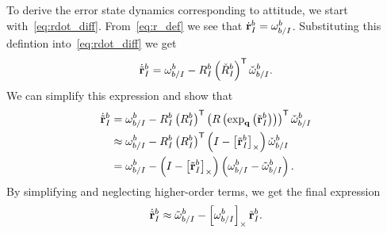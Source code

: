 To derive the error state dynamics corresponding to attitude, we start
with~\eqref{eq:rdot_diff}. From~\eqref{eq:r_def} we see that $\dot{\mathrm{\mathbf{r}}}_I^b
= \mathrm{\mathbf{\omega}}_{b/I}^b$. Substituting this defintion into~\eqref{eq:rdot_diff}
we get
\begin{equation}
\dot{\tilde{\mathrm{\mathbf{r}}}}_I^b = \mathrm{\mathbf{\omega}}_{b/I}^{b} -
R_I^b\left(\check{R}_I^b\right)^{\mathsf{T}} \check{\mathrm{\mathbf{\omega}}}_{b/I}^{b}.
\end{equation}
We can simplify this expression and show that
\begin{align}
  \dot{\tilde{\mathrm{\mathbf{r}}}}_I^b &= \mathrm{\mathbf{\omega}}_{b/I}^{b} -
  R_I^b 
  \left(R_{I}^{b}\right)^{\mathsf{T}}
  \left(R\left(\exp_{\mathrm{\mathbf{q}}}\left(\tilde{\mathrm{\mathbf{r}}}_{I}^{b}\right)\right)\right)^{\mathsf{T}}
  \check{\mathrm{\mathbf{\omega}}}_{b/I}^{b} \\
  &\approx \mathrm{\mathbf{\omega}}_{b/I}^{b} -
  R_I^b \left(R_{I}^{b}\right)^{\mathsf{T}} \left( I - \left[ \tilde{\mathrm{\mathbf{r}}}_I^b \right]_{\times}
  \right) \check{\mathrm{\mathbf{\omega}}}_{b/I}^{b} \\
  &= \mathrm{\mathbf{\omega}}_{b/I}^{b} -
  \left( I - \left[ \tilde{\mathrm{\mathbf{r}}}_I^b \right]_{\times}
  \right) \left(\mathrm{\mathbf{\omega}}_{b/I}^{b} - \tilde{\mathrm{\mathbf{\omega}}}_{b/I}^{b}\right).
\end{align}
By simplifying and neglecting higher-order terms, we get the final expression
\begin{equation}
  \dot{\tilde{\mathrm{\mathbf{r}}}}_I^b \approx \tilde{\mathrm{\mathbf{\omega}}}_{b/I}^{b} -
  \left[ \mathrm{\mathbf{\omega}}_{b/I}^{b}  \right]_{\times} \tilde{\mathrm{\mathbf{r}}}_I^b.
\end{equation}


